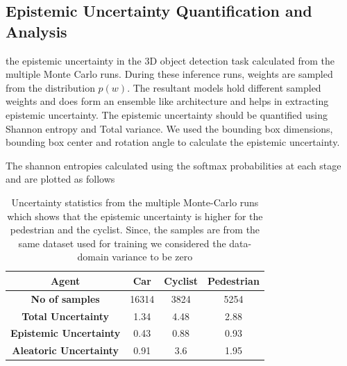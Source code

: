\documentclass[10pt,twocolumn,letterpaper]{article}
\begin{document}
\subsection{Epistemic Uncertainty Quantification and Analysis}
the epistemic uncertainty in the 3D object detection task calculated from the multiple Monte Carlo runs. During these inference runs, weights are sampled from the distribution $p(w)$. The resultant models hold different sampled weights and does form an ensemble like architecture and helps in extracting epistemic uncertainty. The epistemic uncertainty should be quantified using Shannon entropy and Total variance. We used the bounding box dimensions, bounding box center and rotation angle to calculate the epistemic uncertainty.

The shannon entropies calculated using the softmax probabilities at each stage and are plotted as follows 
\begin{table}[!htbp]
    \caption{Uncertainty statistics from the multiple Monte-Carlo runs \label{tab:Uncertianty Statistics} which shows that the epistemic uncertainty is higher for the pedestrian and the cyclist. Since, the samples are from the same dataset used for training we considered the data-domain variance to be zero}
    \centering
    \begin{tabular}{|c|c|c|c|}
        \hline \textbf{Agent} & \textbf{Car} & \textbf{Cyclist} & \textbf{Pedestrian}  \\
        \hline \textbf{No of samples} & 16314 & 3824 & 5254 \\
        \hline \textbf{Total Uncertainty} & 1.34  & 4.48 & 2.88 \\
        \hline \textbf{Epistemic Uncertainty} & 0.43 & 0.88 & 0.93 \\
        \hline \textbf{Aleatoric Uncertainty} & 0.91 & 3.6 & 1.95 \\
        \hline
    \end{tabular}
\end{table}
\end{document}
